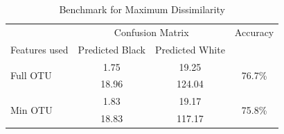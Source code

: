 \begin{table}
	\centering
	\begin{tabular}{l c c c }
		\toprule 
		&\multicolumn{2}{c}{Confusion Matrix} & Accuracy\\
		Features used & Predicted Black&Predicted White&\\ 
		
		\midrule
		\multirow{2}{*}{Full OTU }&  1.75 &19.25&\multirow{2}{*}{76.7\%}\\
								  &	 18.96&124.04 &\\
		\cmidrule{2-3}
		\multirow{2}{*}{Min OTU}    &1.83&19.17&\multirow{2}{*}{75.8\% }\\
									&18.83&117.17&\\
		\bottomrule
		\hline 
	\end{tabular}
	\caption{Benchmark for Maximum Dissimilarity}
	\label{table:benchmarkdissim}
\end{table}


